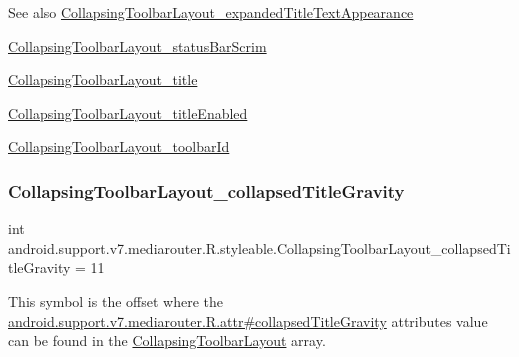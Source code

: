 \begin{DoxySeeAlso}{See also}
\hyperlink{classandroid_1_1support_1_1v7_1_1mediarouter_1_1R_1_1styleable_a9562f47ec6ef350bc545bf9a99118b33}{Collapsing\+Toolbar\+Layout\+\_\+expanded\+Title\+Text\+Appearance} 

\hyperlink{classandroid_1_1support_1_1v7_1_1mediarouter_1_1R_1_1styleable_a33838f98949a195055bcd027fb0c8e1c}{Collapsing\+Toolbar\+Layout\+\_\+status\+Bar\+Scrim} 

\hyperlink{classandroid_1_1support_1_1v7_1_1mediarouter_1_1R_1_1styleable_ab2ba0d03f6955916a430e0ac530551d2}{Collapsing\+Toolbar\+Layout\+\_\+title} 

\hyperlink{classandroid_1_1support_1_1v7_1_1mediarouter_1_1R_1_1styleable_afd96eea83afe0af62d5c951105c47546}{Collapsing\+Toolbar\+Layout\+\_\+title\+Enabled} 

\hyperlink{classandroid_1_1support_1_1v7_1_1mediarouter_1_1R_1_1styleable_a4dcf16bdea9427a02434b698abe1f176}{Collapsing\+Toolbar\+Layout\+\_\+toolbar\+Id} 
\end{DoxySeeAlso}
\mbox{\label{classandroid_1_1support_1_1v7_1_1mediarouter_1_1R_1_1styleable_a4796c2b434065ed0a5d8b8da7097611f}} 
\subsubsection{\texorpdfstring{Collapsing\+Toolbar\+Layout\+\_\+collapsed\+Title\+Gravity}{CollapsingToolbarLayout\_collapsedTitleGravity}}
{\footnotesize\ttfamily int android.\+support.\+v7.\+mediarouter.\+R.\+styleable.\+Collapsing\+Toolbar\+Layout\+\_\+collapsed\+Title\+Gravity = 11\hspace{0.3cm}{\ttfamily [static]}}

This symbol is the offset where the \hyperlink{classandroid_1_1support_1_1v7_1_1mediarouter_1_1R_1_1attr_aa7a18ef11d71b28d4906207ff89e82c8}{android.\+support.\+v7.\+mediarouter.\+R.\+attr\#collapsed\+Title\+Gravity} attribute\textquotesingle{}s value can be found in the \hyperlink{classandroid_1_1support_1_1v7_1_1mediarouter_1_1R_1_1styleable_aae2cb4975e9b9a19d129888f497cc386}{Collapsing\+Toolbar\+Layout} array.

